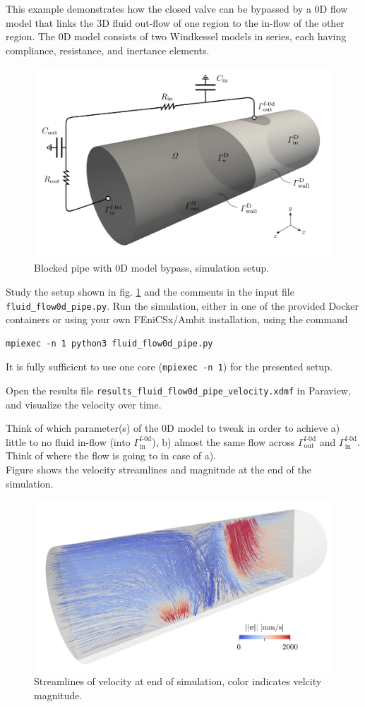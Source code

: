 \documentclass[a4paper,12pt]{report}
\begin{document}
This example demonstrates how the closed valve can be bypassed by a 0D flow model that links the 3D fluid out-flow of one region to the in-flow of the other region. The 0D model consists of two Windkessel models in series, each having compliance, resistance, and inertance elements.

\begin{figure}
\centering
\includegraphics[width=0.8\columnwidth]{fig/pipe_0d_setup}
\caption{Blocked pipe with 0D model bypass, simulation setup.}
\label{fig:pipe_0d_setup}
\end{figure}

Study the setup shown in fig. \ref{fig:pipe_0d_setup} and the comments in the input file \verb"fluid_flow0d_pipe.py". Run the simulation, either in one of the provided Docker containers or using your own FEniCSx/Ambit installation, using the command
\begin{verbatim}
mpiexec -n 1 python3 fluid_flow0d_pipe.py
\end{verbatim}
It is fully sufficient to use one core (\verb"mpiexec -n 1") for the presented setup.

Open the results file \verb"results_fluid_flow0d_pipe_velocity.xdmf" in Paraview, and visualize the velocity over time.

Think of which parameter(s) of the 0D model to tweak in order to achieve a) little to no fluid in-flow (into $\mathit{\Gamma}_{\mathrm{in}}^{\mathrm{f\text{-}0d}}$), b) almost the same flow across $\mathit{\Gamma}_{\mathrm{out}}^{\mathrm{f\text{-}0d}}$ and $\mathit{\Gamma}_{\mathrm{in}}^{\mathrm{f\text{-}0d}}$. Think of where the flow is going to in case of a).\\

Figure shows the velocity streamlines and magnitude at the end of the simulation.

\begin{figure}
\centering
\includegraphics[width=0.7\columnwidth]{fig/pipe_0d_results}
\caption{Streamlines of velocity at end of simulation, color indicates velcity magnitude.}
\label{fig:pipe_0d_results}
\end{figure}


\end{document}
